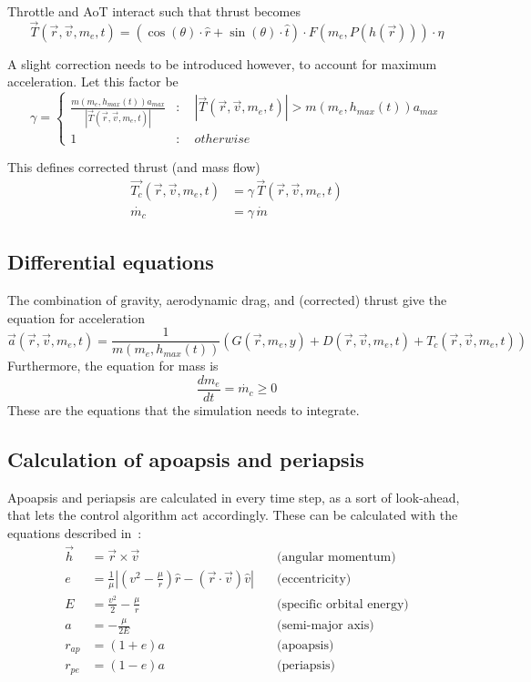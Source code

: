 \documentclass[11pt]{article}
\begin{document}
Throttle and AoT interact such that thrust becomes
$$
\vec{T}(\vec{r}, \vec{v}, m_e, t) = \left( \cos ( \theta ) \cdot\hat{r} + \sin ( \theta ) \cdot\hat{t} \right) \cdot F(m_e, P(h(\vec{r}))) \cdot \eta
$$

A slight correction needs to be introduced however, to account for maximum acceleration.
Let this factor be
$$
\gamma = \begin{cases}
  \frac{m(m_e, h_{max}(t)) a_{max}}{\left| \vec{T}(\vec{r}, \vec{v}, m_e, t) \right|} 
  & : \quad \left| \vec{T}(\vec{r}, \vec{v}, m_e, t) \right| > m(m_e, h_{max}(t)) a_{max}
  \\
  1 
  & : \quad otherwise
\end{cases}
$$

This defines corrected thrust (and mass flow)
$$
\begin{aligned}
  \vec{T_c}(\vec{r}, \vec{v}, m_e, t) & = \gamma \, \vec{T}(\vec{r}, \vec{v}, m_e, t) \\
  \dot{m_c} & = \gamma \, \dot{m}
\end{aligned}
$$
\subsection{Differential equations} \label{sec:eqns}
The combination of gravity, aerodynamic drag, and (corrected) thrust give the equation for acceleration
\begin{equation} \label{eq:diff1}
\vec{a}(\vec{r}, \vec{v}, m_e, t) = \frac{1}{m(m_e, h_{max}(t))} \left( G(\vec{r}, m_e, y) + D(\vec{r}, \vec{v}, m_e, t) + T_c(\vec{r}, \vec{v}, m_e, t) \right)
\end{equation}
Furthermore, the equation for mass is
\begin{equation} \label{eq:diff2}
\frac{d m_e}{dt} = \dot{m_c} \geq 0
\end{equation}
These are the equations that the simulation needs to integrate.


\subsection{Calculation of apoapsis and periapsis}
Apoapsis and periapsis are calculated in every time step, as a sort of look-ahead, that lets the control algorithm act accordingly.
These can be calculated with the equations described in~\cite{kepler}:
$$
\begin{aligned}
  \vec{h} & = \vec{r} \times \vec{v}   
  & \quad \text{(angular momentum)} \\
  e & = \frac{1}{\mu} \left| \left( v^2 - \frac{\mu}{r} \right) \hat{r} - \left( \vec{r}\cdot\vec{v} \right) \hat{v}\right| 
  & \quad \text{(eccentricity)} \\
  E & = \frac{v^2}{2} - \frac{\mu}{r}  
  & \quad \text{(specific orbital energy)} \\
  a & = -\frac{\mu}{2E}   
  & \quad \text{(semi-major axis)} \\
  r_{ap} & = \left( 1 + e \right) a
  & \quad \text{(apoapsis)} \\
  r_{pe} & = \left( 1 - e \right) a
  & \quad \text{(periapsis)} \\
\end{aligned}
$$
\end{document}

